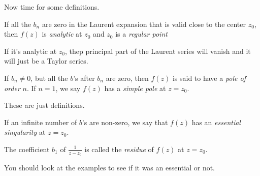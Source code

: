 Now time for some definitions.
\begin{definition}
    If all the $b_n$ are zero in the Laurent expansion that is valid close to
    the center $z_0$,
    then $f(z)$ is \emph{analytic} at $z_0$
    and $z_0$ is a \emph{regular point}
\end{definition}
If it's analytic at $z_0$,
thep principal part of the Laurent series will vanish
and it will just be a Taylor series.
\begin{definition}[pole]
    If $b_n\ne 0$,
    but all the $b$'s after $b_n$ are zero,
    then $f(z)$ is said to have a \emph{pole of order} $n$.
    If $n=1$,
    we say $f(z)$ has a \emph{simple pole} at $z=z_0$.
\end{definition}
These are just definitions.

\begin{definition}
    If an infinite number of $b$'s are non-zero,
    we say that $f(z)$ has an \emph{essential singularity}
    at $z=z_0$.
\end{definition}

\begin{definition}[residue]
    The coefficient $b_1$ of $\frac{1}{z - z_0}$ is called the
    \emph{residue} of $f(z)$ at $z=z_0$.
\end{definition}

You should look at the examples to see if it was an essential or not.
